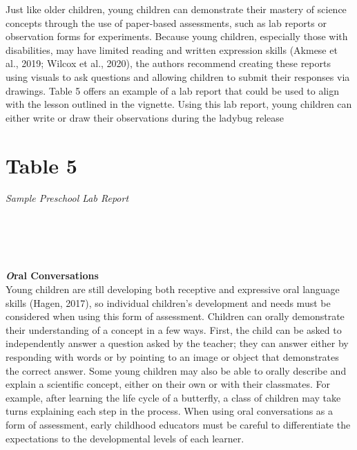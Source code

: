 \documentclass[11.5pt]{sig-alternate}
\begin{document}
\begin{large}
Just like older children, young children can demonstrate their mastery of science concepts through the use of paper-based assessments, such as lab reports or observation forms for experiments. Because young children, especially those with disabilities, may have limited reading and written expression skills (Akmese et al., 2019; Wilcox et al., 2020), the authors recommend creating these reports using visuals to ask questions and allowing children to submit their responses via drawings. Table 5 offers an example of a lab report that could be used to align with the lesson outlined in the vignette. Using this lab report, young children can either write or draw their observations during the ladybug release
\newpage
\section*{Table 5}
\textit{Sample Preschool Lab Report}
\\\\
\noindent \begin{minipage}{\linewidth}
\end{minipage}
\\\\\\
\textbf{\emph Oral Conversations }
\\
Young children are still developing both receptive and expressive oral language skills (Hagen, 2017), so individual children’s development and needs must be considered when using this form of assessment. Children can orally demonstrate their understanding of a concept in a few ways. First, the child can be asked to independently answer a question asked by the teacher; they can answer either by responding with words or by pointing to an image or object that demonstrates the correct answer. Some young children may also be able to orally describe and explain a scientific concept, either on their own or with their classmates. For example, after learning the life cycle of a butterfly, a class of children may take turns explaining each step in the process. When using oral conversations as a form of assessment, early childhood educators must be careful to differentiate the expectations to the developmental levels of each learner.

\end{large}
\end{document}
